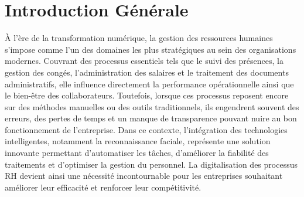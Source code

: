 \chapter*{Introduction Générale}


 À l’ère de la transformation numérique, la gestion des ressources humaines s’impose comme l’un des domaines les plus stratégiques au sein des organisations modernes. Couvrant des processus essentiels tels que le suivi des présences, la gestion des congés, l’administration des salaires et le traitement des documents administratifs, elle influence directement la performance opérationnelle ainsi que le bien-être des collaborateurs. Toutefois, lorsque ces processus reposent encore sur des méthodes manuelles ou des outils traditionnels, ils engendrent souvent des erreurs, des pertes de temps et un manque de transparence pouvant nuire au bon fonctionnement de l’entreprise. Dans ce contexte, l’intégration des technologies intelligentes, notamment la reconnaissance faciale, représente une solution innovante permettant d’automatiser les tâches, d’améliorer la fiabilité des traitements et d’optimiser la gestion du personnel. La digitalisation des processus RH devient ainsi une nécessité incontournable pour les entreprises souhaitant améliorer leur efficacité et renforcer leur compétitivité.

